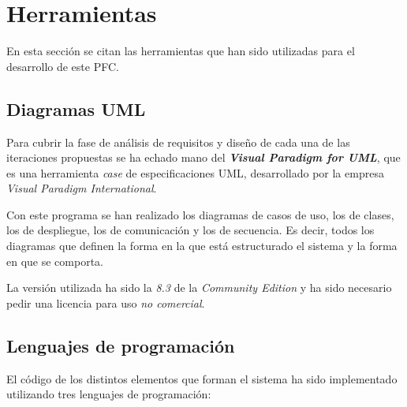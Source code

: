 
\section{Herramientas}
En esta sección se citan las herramientas que han sido utilizadas para el 
desarrollo de este \acs{PFC}.

  \subsection{Diagramas \acs{UML}}
  Para cubrir la fase de análisis de requisitos y diseño de cada una de las
  iteraciones propuestas se ha echado mano del \emph{\textbf{Visual Paradigm
  for \acs{UML}}}, que es una herramienta \emph{case} de especificaciones
  \acs{UML}, desarrollado por la empresa \emph{Visual Paradigm International}.

  Con este programa se han realizado los diagramas de casos de uso, los de
  clases, los de despliegue, los de comunicación y los de secuencia. Es decir,
  todos los diagramas que definen la forma en la que está estructurado el
  sistema y la forma en que se comporta.

  La versión utilizada ha sido la \emph{8.3} de la \emph{Community Edition} y
  ha sido necesario pedir una licencia para uso \emph{no comercial}.

  \subsection{Lenguajes de programación}
  El código de los distintos elementos que forman el sistema ha sido
  implementado utilizando tres lenguajes de programación:

